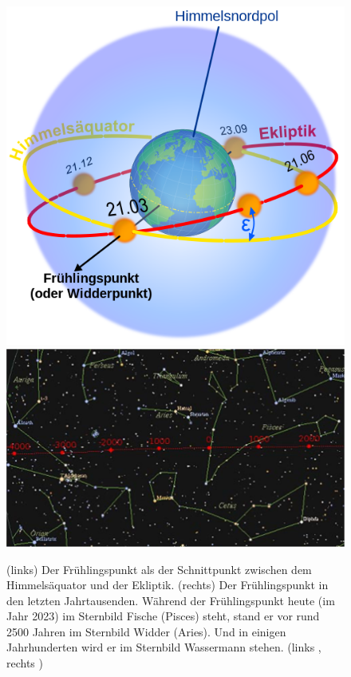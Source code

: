 \begin{figure}[htb]
\includegraphics[scale=0.3]{./Bilder/Ecliptic.png}\hfill
\includegraphics[scale=0.6]{./Bilder/Fr-Punkt.png}
\caption{\label{fig_Fruehlingspunkt}%
(links) Der Fr\"uhlingspunkt als der Schnittpunkt zwischen dem Himmels\"aquator und
der Ekliptik. (rechts) Der Fr\"uhlingspunkt in den letzten Jahrtausenden. W\"ahrend der 
Fr\"uhlingspunkt heute (im Jahr 2023)
im Sternbild Fische (Pisces) steht, stand er vor rund 2500 Jahren im Sternbild
Widder (Aries). Und in einigen Jahrhunderten wird er im Sternbild Wassermann stehen.
(links \cite{Wiki_Fruehling}, rechts \cite{Rocket})}
\end{figure}
 
